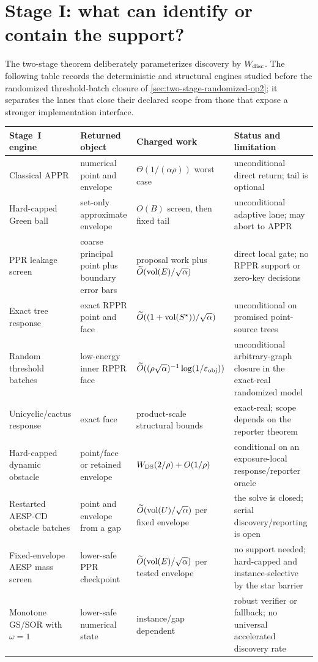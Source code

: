 \section{Stage I: what can identify or contain the support?}
\label{sec:two-stage-discovery}

The two-stage theorem deliberately parameterizes discovery by
$W_{\rm disc}$.  The following table records the deterministic and structural
engines studied before the randomized threshold-batch closure of
\cref{sec:two-stage-randomized-op2}; it separates the lanes that close their
declared scope from those that expose a stronger implementation interface.

\begin{center}
\small
\begin{tabularx}{\textwidth}{@{}p{}p{}p{}X@{}}
\toprule
Stage~I engine & Returned object & Charged work & Status and limitation \\
\midrule
Classical APPR & numerical point and envelope &
$\Theta(1/(\alpha\rho))$ worst case &
unconditional direct return; tail is optional \\
Hard-capped Green ball & set-only approximate envelope &
$O(B)$ screen, then fixed tail &
unconditional adaptive lane; may abort to APPR \\
PPR leakage screen & coarse principal point plus boundary error bars &
proposal work plus $\widetilde O(\operatorname{vol}(E)/\sqrt\alpha)$ &
direct local gate; no RPPR support or zero-key decisions \\
Exact tree response & exact RPPR point and face &
$\widetilde O((1+\operatorname{vol}(S^\star))/\sqrt\alpha)$ &
unconditional on promised point-source trees \\
Random threshold batches & low-energy inner RPPR face &
$\widetilde O((\rho\sqrt\alpha)^{-1}\log(1/\varepsilon_{\rm obj}))$ &
unconditional arbitrary-graph closure in the exact-real randomized model \\
Unicyclic/cactus response & exact face &
product-scale structural bounds &
exact-real; scope depends on the reporter theorem \\
Hard-capped dynamic obstacle & point/face or retained envelope &
$W_{\rm DS}(2/\rho)+O(1/\rho)$ &
conditional on an exposure-local response/reporter oracle \\
Restarted AESP-CD obstacle batches & point and envelope from a gap &
$\widetilde O(\operatorname{vol}(U)/\sqrt\alpha)$ per fixed envelope &
the solve is closed; serial discovery/reporting is open \\
Fixed-envelope AESP mass screen & lower-safe PPR checkpoint &
$\widetilde O(\operatorname{vol}(E)/\sqrt\alpha)$ per tested envelope &
no support needed; hard-capped and instance-selective by the star barrier \\
Monotone GS/SOR with $\omega=1$ & lower-safe numerical state &
instance/gap dependent &
robust verifier or fallback; no universal accelerated discovery rate \\
\bottomrule
\end{tabularx}
\end{center}

